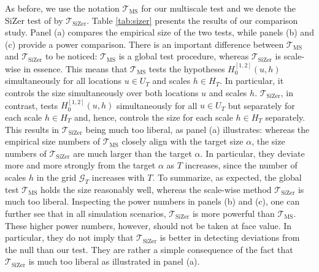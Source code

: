 \documentclass[12pt]{article}
\begin{document}
As before, we use the notation $\mathcal{T}_{\text{MS}}$ for our multiscale test and we denote the SiZer test of \cite{Park2009} by $\mathcal{T}_{\text{SiZer}}$. Table \ref{tab:sizer} presents the results of our comparison study. Panel (a) compares the empirical size of the two tests, while panels (b) and (c) provide a power comparison. 
There is an important difference between $\mathcal{T}_{\text{MS}}$ and $\mathcal{T}_{\text{SiZer}}$ to be noticed: $\mathcal{T}_{\text{MS}}$ is a global test procedure, whereas $\mathcal{T}_{\text{SiZer}}$ is scale-wise in essence. This means that $\mathcal{T}_{\text{MS}}$ tests the hypotheses $H_0^{[1,2]}(u,h)$ simultaneously for all locations $u \in U_T$ and scales $h \in H_T$. In particular, it controls the size simultaneously over both locations $u$ and scales $h$. $\mathcal{T}_{\text{SiZer}}$, in contrast, tests $H_0^{[1,2]}(u,h)$ simultaneously for all $u \in U_T$ but separately for each scale $h \in H_T$ and, hence, controls the size for each scale $h \in H_T$ separately. This results in $\mathcal{T}_{\text{SiZer}}$ being much too liberal, as panel (a) illustrates: whereas the empirical size numbers of $\mathcal{T}_{\text{MS}}$ closely align with the target size $\alpha$, the size numbers of $\mathcal{T}_{\text{SiZer}}$ are much larger than the target $\alpha$. In particular, they deviate more and more strongly from the target $\alpha$ as $T$ increases, since the number of scales $h$ in the grid $\mathcal{G}_T$ increases with $T$. To summarize, as expected, the global test $\mathcal{T}_{\text{MS}}$ holds the size reasonably well, whereas the scale-wise method $\mathcal{T}_{\text{SiZer}}$ is much too liberal.
Inspecting the power numbers in panels (b) and (c), one can further see that in all simulation scenarios, $\mathcal{T}_{\text{SiZer}}$ is more powerful than $\mathcal{T}_{\text{MS}}$. These higher power numbers, however, should not be taken at face value. In particular, they do not imply that $\mathcal{T}_{\text{SiZer}}$ is better in detecting deviations from the null than our test. They are rather a simple consequence of the fact that $\mathcal{T}_{\text{SiZer}}$ is much too liberal as illustrated in panel (a).
\end{document}
